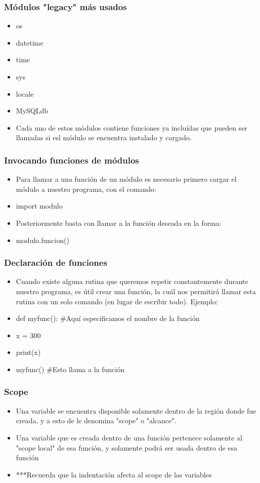 \documentclass[hyperref={pdfpagelabels=false},xcolor=pst,pdf,fragile]{beamer}
\begin{document}
\begin{frame}
    \frametitle{Módulos "legacy" más usados}
    \pause
    \begin{itemize}
    \item os
    \item datetime
    \item time
    \item sys
    \item locale
    \item MySQLdb
    \item Cada uno de estos módulos contiene funciones ya incluídas que pueden ser llamadas si esl módulo se encuentra instalado y cargado.
    \end{itemize}
\end{frame}

\begin{frame}
    \frametitle{Invocando funciones de módulos}
    \pause
    \begin{itemize}
    \item Para llamar a una función de un módulo es necesario primero cargar el módulo a nuestro programa, con el comando:
    \item import modulo
    \item Posteriormente basta con llamar a la función deseada en la forma:
    \item modulo.funcion()
    \end{itemize}
\end{frame}

\begin{frame}
    \frametitle{Declaración de funciones}
    \pause
    \begin{itemize}
    \item Cuando existe alguna rutina que queremos repetir constantemente durante nuestro programa, es útil crear una función, la cuál nos permitirá llamar esta rutina con un solo comando (en lugar de escribir todo). Ejemplo:
    \item def myfunc(): \#Aquí especificamos el nombre de la función
    \item \quad \quad \quad x = 300
    \item \quad \quad \quad print(x)
    \item myfunc() \#Esto llama a la función
    \end{itemize}
\end{frame}

\begin{frame}
    \frametitle{Scope}
    \pause
    \begin{itemize}
    \item Una variable se encuentra disponible solamente dentro de la región donde fue creada, y a esto de le denomina "scope" o "alcance".
    \item Una variable que es creada dentro de una función pertenece solamente al "scope local" de esa función, y solamente podrá ser usada dentro de esa función
    \item ***Recuerda que la indentación afecta al scope de las variables
    \end{itemize}
\end{frame}
\end{document}
